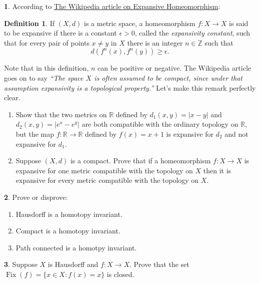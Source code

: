\documentclass[11pt]{article}
\theoremstyle{definition}
\newtheorem*{definition*}{Definition}
\newtheorem{problem}{}
\newcommand{\bp}{\begin{problem}}
\newcommand{\ep}{\end{problem}\bigskip}
\theoremstyle{theorem}
\newcommand{\R}{\mathbb{R}}
\DeclareMathOperator{\fix}{\mathrm{Fix}}
\begin{document}
\bp According to \href{https://en.wikipedia.org/wiki/Expansive_homeomorphism}{The Wikipedia article on Expansive Homeomorphism}:
\begin{definition*}
If $( X , d )$ is a metric space, a homeomorphism $f : X \to X$ is said to be expansive if there is a constant $\epsilon >0$, called the \emph{expansivity constant}, such that for every pair of points $x \neq y$ in $X$ there is an integer $n\in \mathbb{Z}$ such that
\[d ( f^n ( x ) , f^n ( y ) ) \geq \epsilon.\]
\end{definition*}

\noindent Note that in this definition, $n$ can be positive or negative.   The Wikipedia article goes on to say \emph{``The space $X$ is often assumed to be compact, since under that assumption expansivity is a topological property.''}  Let's make this remark perfectly clear.

\begin{enumerate}[label=(\alph*)]
\item Show that the two metrics on $\R$ defined by $d_1(x,y)=|x-y|$ and $d_2(x,y)=|e^x-e^y|$ are both compatible with the ordinary topology on $\R$, but the map $f:\R \to \R$ defined by $f(x)=x+1$ is expansive for $d_2$ and not expansive for $d_1$.
\item Suppose $(X,d)$ is a compact.  Prove that if a homeomorphism $f:X \to X$ is expansive for one metric compatible with the topology on $X$ then it is expansive for every metric compatible with the topology on $X$.
\end{enumerate}
\ep

\bp Prove or disprove:
\begin{enumerate}[label=(\alph*)] 
    \item Hausdorff is a homotopy invariant.
    \item Compact is a homotopy invariant.
    \item Path connected is a homotpy invariant.
\end{enumerate}
\ep

\bp Suppose $X$ is Hausdorff and $f:X \to X$.  Prove that the set $\fix(f)=\{x\in X:f(x)=x\}$ is closed.
\ep
\end{document}
